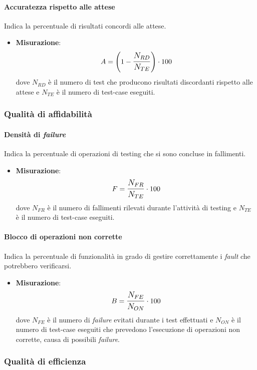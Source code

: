\paragraph{Accuratezza rispetto alle attese}
Indica la percentuale di risultati concordi alle attese.
\begin{itemize}
	\item \textbf{Misurazione}: 
		$$A=\left(1-\mathlarger{\frac{N_{RD}}{N_{TE}}}\right) \cdot 100$$
	dove $N_{RD}$ è il numero di test che producono risultati discordanti rispetto alle attese e $N_{TE}$ è il numero di test-case eseguiti.
\end{itemize}

\subsubsection{Qualità di affidabilità}
\paragraph{Densità di \textit{failure}}
Indica la percentuale di operazioni di testing che si sono concluse in fallimenti.

\begin{itemize}
	\item \textbf{Misurazione}: 
		$$F=\mathlarger{\frac{N_{FR}}{N_{TE}}} \cdot 100$$
	dove $N_{FR}$ è il numero di fallimenti rilevati durante l'attività di testing e $N_{TE}$ è il numero di test-case eseguiti.
\end{itemize}

\paragraph{Blocco di operazioni non corrette}
Indica la percentuale di funzionalità in grado di gestire correttamente i \textit{fault} che potrebbero verificarsi.
\begin{itemize}
	\item \textbf{Misurazione}: 
		$$B=\mathlarger{\frac{N_{FE}}{N_{ON}}} \cdot 100$$
	dove $N_{FE}$ è il numero di \textit{failure} evitati durante i test effettuati e $N_{ON}$ è il numero di test-case eseguiti che prevedono l'esecuzione di operazioni non corrette, causa di possibili \textit{failure}.
\end{itemize}

\subsubsection{Qualità di efficienza}

